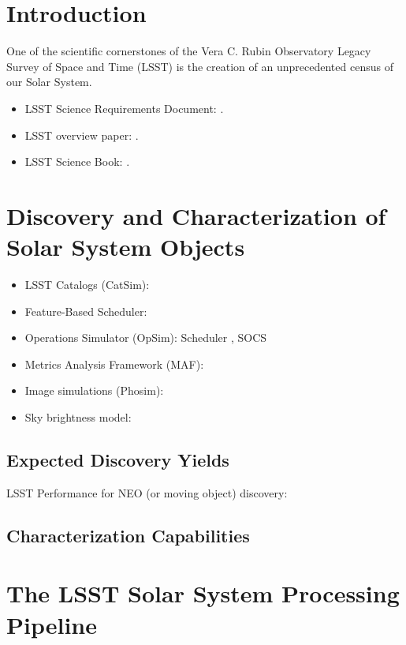 \section{Introduction}

One of the scientific cornerstones of the Vera C. Rubin Observatory Legacy Survey of Space and Time (LSST)
is the creation of an unprecedented census of our Solar System.

\begin{itemize}
\item LSST Science Requirements Document: \cite{LPM-17}.
\item LSST overview paper: \cite{2008arXiv0805.2366I}.
\item LSST Science Book: \cite{abell2009lsst}.
\end{itemize}

\section{Discovery and Characterization of Solar System Objects}

\begin{itemize}
\item LSST Catalogs (CatSim): \cite{2014SPIE.9150E..14C}
\item Feature-Based Scheduler: \cite{2018arXiv181004815N}
\item Operations Simulator (OpSim): Scheduler \cite{2016SPIE.9910E..13D}, SOCS \cite{2016SPIE.9911E..25R}
\item Metrics Analysis Framework (MAF): \cite{2014SPIE.9149E..0BJ}
\item Image simulations (Phosim): \cite{2015ApJS..218...14P}
\item Sky brightness model: \cite{2016SPIE.9910E..1AY}
\end{itemize}

\subsection{Expected Discovery Yields}
LSST Performance for NEO (or moving object) discovery: \cite{2018Icar..303..181J}
\subsection{Characterization Capabilities}
\vspace{0.4cm}

\section{The LSST Solar System Processing Pipeline}


